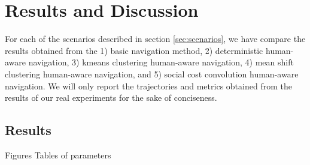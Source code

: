 \section{Results and Discussion}

For each of the scenarios described in section \ref{sec:scenarios}, we have compare the results obtained from the 1) basic navigation method, 2) deterministic human-aware navigation, 3) kmeans clustering human-aware navigation, 4) mean shift clustering human-aware navigation, and 5) social cost convolution human-aware navigation. We will only report the trajectories and metrics obtained from the results of our real experiments for the sake of conciseness.






\subsection{Results}
\label{sec:results}

Figures
Tables of parameters



